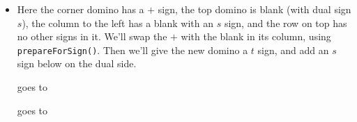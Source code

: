 \documentclass[12pt]{article}
\numberwithin{equation}{section}
\newcommand{\horizontalDominoRSShift}[4]{\filldraw [dominoRSStyle] (#2 - 1 + #4 + \eps, #1 - 1 + \eps) rectangle + (2 - \teps, 1 -\teps) node [dominoText] {$#3$};}
\newcommand{\verticalDominoRSShift}[4]{\filldraw [dominoRSStyle] (#2 - 1 + #4 + \eps,  #1 - 1 + \eps) rectangle + (1 - \teps,2 -\teps) node [dominoText] {$#3$};}
\begin{document}
\begin{itemize}
\begin{itemize}
      \item Here the corner domino has a $+$ sign, the top domino is blank (with dual sign $s$), the column to the left has a blank with an $s$ sign, and the row on top has no other signs in it.
      We'll swap the $+$ with the blank in its column, using \texttt{prepareForSign()}.
      Then we'll give the new domino a $t$ sign, and add an $s$ sign below on the dual side.
      \begin{figure}[H]
        \centering
      \end{figure}
      goes to
      \begin{figure}[H]
        \centering
      \end{figure}
      goes to
      \begin{figure}[H]

\end{figure}
\end{itemize}
\end{itemize}
\end{document}
